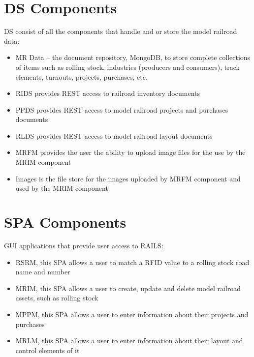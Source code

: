 \section{\acl{DS} Components}
\ac{DS} consist of all the components that handle and or store the model railroad data:
\begin{itemize}
  \item MR Data – the document repository, MongoDB, to store complete collections of items such as rolling stock, industries (producers and consumers), track elements, turnouts, projects, purchases, etc.
  \item \ac{RIDS} provides \ac{REST} access to railroad inventory documents
  \item \ac{PPDS} provides \ac{REST} access to model railroad projects and purchases documents
  \item \ac{RLDS} provides \ac{REST} access to model railroad layout documents
  \item \ac{MRFM} provides the user the ability to upload image files for the use by the \ac{MRIM} component
  \item Images is the file store for the images uploaded by \ac{MRFM} component and used by the \ac{MRIM} component
\end{itemize}
\section{\acl{SPA} Components}
\ac{GUI} applications that provide user access to RAILS:
\begin{itemize}
  \item \ac{RSRM}, this \ac{SPA} allows a user to match a RFID value to a rolling stock road name and number
  \item \ac{MRIM}, this \ac{SPA} allows a user to create, update and delete model railroad assets, such as rolling stock
  \item \ac{MPPM}, this \ac{SPA} allows a user to enter information about their projects and purchases
  \item \ac{MRLM}, this \ac{SPA} allows a user to enter information about their layout and control elements of it
\end{itemize}
